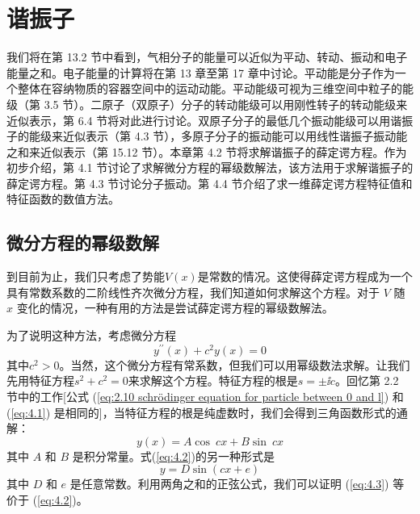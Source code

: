 \chapter{谐振子}
\label{chap:4}
    我们将在第 13.2 节中看到，气相分子的能量可以近似为平动、转动、振动和电子能量之和。电子能量的计算将在第 13 章至第 17 章中讨论。平动能是分子作为一个整体在容纳物质的容器空间中的运动动能。平动能级可视为三维空间中粒子的能级（第 3.5 节）。二原子（双原子）分子的转动能级可以用刚性转子的转动能级来近似表示，第 6.4 节将对此进行讨论。双原子分子的最低几个振动能级可以用谐振子的能级来近似表示（第 4.3 节），多原子分子的振动能可以用线性谐振子振动能之和来近似表示（第 15.12 节）。本章第 4.2 节将求解谐振子的薛定谔方程。作为初步介绍，第 4.1 节讨论了求解微分方程的幂级数解法，该方法用于求解谐振子的薛定谔方程。第 4.3 节讨论分子振动。第 4.4 节介绍了求一维薛定谔方程特征值和特征函数的数值方法。
\section{微分方程的幂级数解}
\label{sec:4.1 Power-Series Solutions of Differential Equations}
    到目前为止，我们只考虑了势能$V\left(x\right)$是常数的情况。这使得薛定谔方程成为一个具有常数系数的二阶线性齐次微分方程，我们知道如何求解这个方程。对于 $V$ 随 $x$ 变化的情况，一种有用的方法是尝试薛定谔方程的幂级数解法。

    为了说明这种方法，考虑微分方程
    \begin{equation}
        y^{\prime\prime}\left(x\right) + c^2 y\left(x\right) = 0
        \label{eq:4.1}
    \end{equation}
    其中$c^2>0$。当然，这个微分方程有常系数，但我们可以用幂级数法求解。让我们先用特征方程$s^2+c^2=0$来求解这个方程。特征方程的根是$s=\pm \ii c$。回忆第 2.2 节中的工作[公式 (\ref{eq:2.10 schrödinger equation for particle between 0 and l}) 和 (\ref{eq:4.1}) 是相同的]，当特征方程的根是纯虚数时，我们会得到三角函数形式的通解：
    \begin{equation}
        y\left(x\right) = A \cos\: cx + B \sin\: cx
        \label{eq:4.2}
    \end{equation}
    其中 $A$ 和 $B$ 是积分常量。式(\ref{eq:4.2})的另一种形式是
    \begin{equation}
        y = D \sin\left(cx+e\right)
        \label{eq:4.3}
    \end{equation}
    其中 $D$ 和 $e$ 是任意常数。利用两角之和的正弦公式，我们可以证明 (\ref{eq:4.3}) 等价于 (\ref{eq:4.2})。

